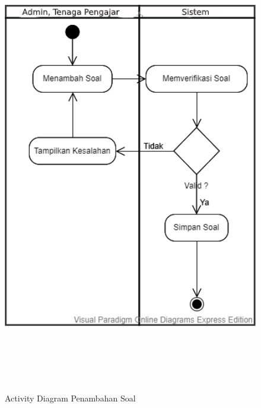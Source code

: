 \documentclass{scrreprt}
\begin{document}
		\begin{figure}
			\includegraphics[width=15cm, height=20cm]{Activity-diagram-penambahan-soal.png}
			\caption{Activity Diagram Penambahan Soal}
		\end{figure}
	
\end{document}
